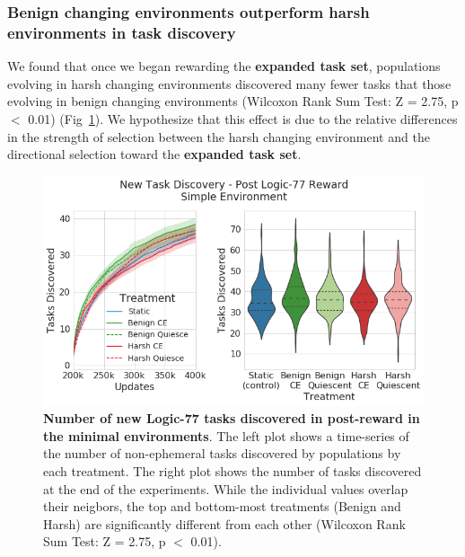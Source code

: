 \documentclass[10pt,letterpaper]{article}
\begin{document}
\subsubsection*{Benign changing environments outperform harsh environments in task discovery}
We found that once we began rewarding the \textbf{expanded task set}, populations evolving in harsh changing environments discovered many fewer tasks that those evolving in benign changing environments (Wilcoxon Rank Sum Test: Z = 2.75, p $<$ 0.01) (Fig~\ref{fig:postreward_task_discovery}). We hypothesize that this effect is due to the relative differences in the strength of selection between the harsh changing environment and the directional selection toward the \textbf{expanded task set}. 
	\begin{figure}[!h]
	\includegraphics[width=0.95\columnwidth]{figures/LTE/lte-simple-post_reward_task_discovery.png}
	\caption{\textbf{Number of new Logic-77 tasks discovered in post-reward in the minimal environments}. The left plot shows a time-series of the number of non-ephemeral tasks discovered by populations by each treatment. The right plot shows the number of tasks discovered at the end of the experiments. While the individual values overlap their neigbors, the top and bottom-most treatments (Benign and Harsh) are significantly different from each other (Wilcoxon Rank Sum Test: Z = 2.75, p $<$ 0.01). %
	}
	\label{fig:postreward_task_discovery}
	\end{figure} 
\end{document}
